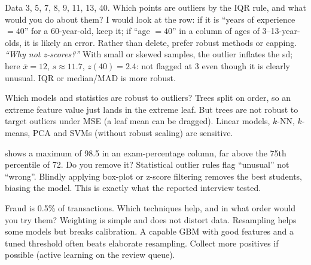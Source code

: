 \begin{qa}{ Data 3, 5, 7, 8, 9, 11, 13, 40. Which points are outliers by the IQR rule, and what would you do about them?}
\why I would look at the row: if it is ``years of experience $=40$'' for a 60-year-old, keep it; if ``age $=40$'' in a column of ages of 3--13-year-olds,
it is likely an error. Rather than delete, prefer robust methods or capping.
\pushes \emph{``Why not z-scores?''} With small or skewed samples, the outlier inflates the sd; here $\bar x = 12$, $s\approx11.7$, $z(40) = 2.4$: not flagged
at 3 even though it is clearly unusual. IQR or median/MAD is more robust.
\end{qa}

\begin{qa}{ Which models and statistics are robust to outliers?}
\why Trees split on order, so an extreme feature value just lands in the extreme leaf. But trees are not robust to target outliers under MSE (a
leaf mean can be dragged). Linear models, $k$-NN, $k$-means, PCA and SVMs (without robust scaling) are sensitive.
\end{qa}

\begin{qa}{  shows a maximum of 98.5 in an exam-percentage column, far above the 75th
percentile of 72. Do you remove it?}
\why Statistical outlier rules flag ``unusual'' not ``wrong''. Blindly applying box-plot or z-score filtering removes the best students, biasing the
model. This is exactly what the reported interview tested.
\end{qa}

\begin{qa}{ Fraud is 0.5\% of transactions. Which techniques help, and in what order would you try them?}
\why Weighting is simple and does not distort data. Resampling helps some models but breaks calibration. A capable GBM with good features and a
tuned threshold often beats elaborate resampling. Collect more positives if possible (active learning on the review queue).
\end{qa}

